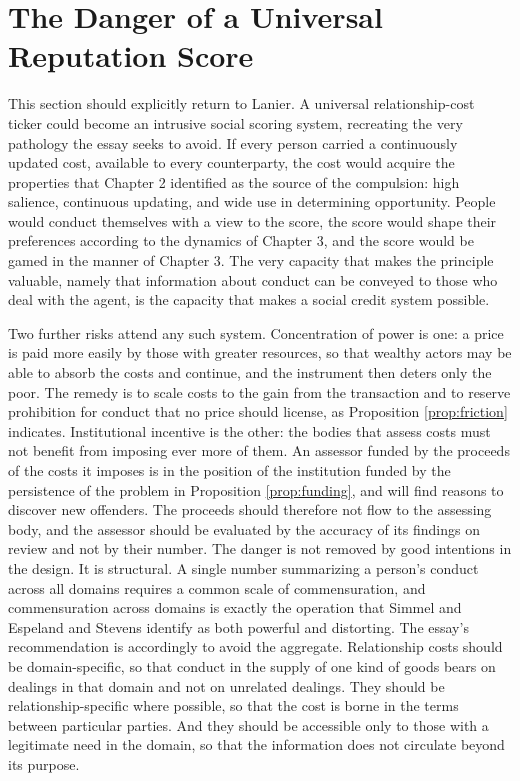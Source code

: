\documentclass[11pt]{report}
\theoremstyle{definition}
\theoremstyle{remark}
\begin{document}
\section{The Danger of a Universal Reputation Score}

This section should explicitly return to Lanier. A universal relationship-cost ticker could become an intrusive social scoring system, recreating the very pathology the essay seeks to avoid. If every person carried a continuously updated cost, available to every counterparty, the cost would acquire the properties that Chapter 2 identified as the source of the compulsion: high salience, continuous updating, and wide use in determining opportunity. People would conduct themselves with a view to the score, the score would shape their preferences according to the dynamics of Chapter 3, and the score would be gamed in the manner of Chapter 3. The very capacity that makes the principle valuable, namely that information about conduct can be conveyed to those who deal with the agent, is the capacity that makes a social credit system possible.

Two further risks attend any such system. Concentration of power is one: a price is paid more easily by those with greater resources, so that wealthy actors may be able to absorb the costs and continue, and the instrument then deters only the poor. The remedy is to scale costs to the gain from the transaction and to reserve prohibition for conduct that no price should license, as Proposition \ref{prop:friction} indicates. Institutional incentive is the other: the bodies that assess costs must not benefit from imposing ever more of them. An assessor funded by the proceeds of the costs it imposes is in the position of the institution funded by the persistence of the problem in Proposition \ref{prop:funding}, and will find reasons to discover new offenders. The proceeds should therefore not flow to the assessing body, and the assessor should be evaluated by the accuracy of its findings on review and not by their number. The danger is not removed by good intentions in the design. It is structural. A single number summarizing a person's conduct across all domains requires a common scale of commensuration, and commensuration across domains is exactly the operation that Simmel and Espeland and Stevens \cite{espeland} identify as both powerful and distorting. The essay's recommendation is accordingly to avoid the aggregate. Relationship costs should be domain-specific, so that conduct in the supply of one kind of goods bears on dealings in that domain and not on unrelated dealings. They should be relationship-specific where possible, so that the cost is borne in the terms between particular parties. And they should be accessible only to those with a legitimate need in the domain, so that the information does not circulate beyond its purpose.
\end{document}
